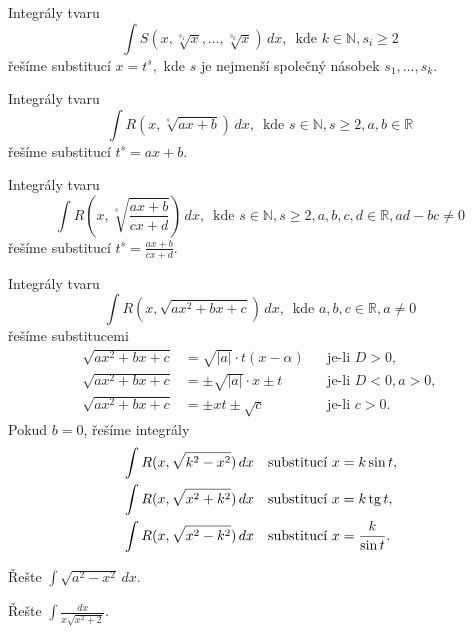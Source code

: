 \begin{veta}
    Integrály tvaru
    $$\int S(x, \sqrt[s_1]{x}, \dots, \sqrt[s_k]{x}  ) \, dx ,\,\,\, \textrm{kde } k \in \mathbb N, s_i \geq 2$$
    řešíme substitucí $x=t^s,$ kde $s$ je nejmenší společný násobek $s_1,\dots, s_k.$
\end{veta}

\begin{veta}
    Integrály tvaru
    $$\int R(x, \sqrt[s]{ax+b} )\, dx, \,\,\, \textrm{kde } s \in \mathbb N, s \geq 2, a,b \in \mathbb R$$
    řešíme substitucí $t^s=ax+b$.
\end{veta}

\begin{veta}
    Integrály tvaru
    $$\int R\left (x, \sqrt[s]{\frac{ax+b}{cx+d}} \right)\, dx, \,\,\, \textrm{kde } s \in \mathbb N, s \geq 2, a,b,c,d \in \mathbb R, ad-bc \ne 0$$
    řešíme substitucí $t^s=\frac{ax+b}{cx+d}.$
\end{veta}

\begin{veta}
    Integrály tvaru
    $$\int R(x,\sqrt{ax^2+bx+c}) \, dx, \,\,\, \textrm{kde } a,b,c\in \mathbb R, a \ne 0$$
    řešíme substitucemi
    \begin{align*}
    \sqrt{ax^2+bx+c} &= \sqrt{|a|}\cdot t(x-\alpha) & & \textrm{je-li }D >0,  \\
    \sqrt{ax^2+bx+c} &= \pm\sqrt{|a|}\cdot x\pm t & & \textrm{je-li }D <0, a>0, \\
    \sqrt{ax^2+bx+c} &= \pm xt \pm \sqrt{c}  & & \textrm{je-li }c >0.
    \end{align*}
    Pokud $b=0$, řešíme integrály
    \begin{align*}
        &\int R(x, \sqrt{k^2-x^2} )\, dx & & \textrm{substitucí } x=k\sin t, \\
        &\int R(x, \sqrt{x^2+k^2})\, dx & & \textrm{substitucí } x=k\operatorname{tg} t, \\
        &\int R(x, \sqrt{x^2-k^2} )\, dx & & \textrm{substitucí } x=\frac{k}{\sin t}.
    \end{align*}
\end{veta}

\begin{priklad}
Řešte $\int \sqrt{a^2-x^2}\, dx. $
\end{priklad}

\begin{priklad}
Řešte $\int \frac{dx}{x \sqrt{x^2+2} }.$
\end{priklad}

